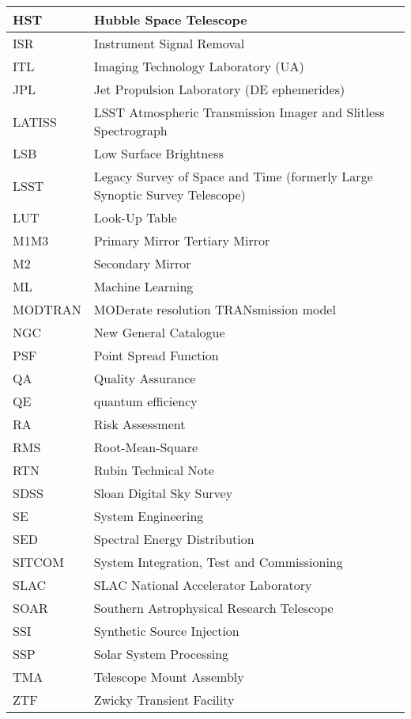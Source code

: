 \begin{longtable}{p{}p{}}
HST & Hubble Space Telescope \\\hline
ISR & Instrument Signal Removal \\\hline
ITL & Imaging Technology Laboratory (UA) \\\hline
JPL & Jet Propulsion Laboratory (DE ephemerides) \\\hline
LATISS & LSST Atmospheric Transmission Imager and Slitless Spectrograph \\\hline
LSB & Low Surface Brightness \\\hline
LSST & Legacy Survey of Space and Time (formerly Large Synoptic Survey Telescope) \\\hline
LUT & Look-Up Table \\\hline
M1M3 & Primary Mirror Tertiary Mirror \\\hline
M2 & Secondary Mirror \\\hline
ML & Machine Learning \\\hline
MODTRAN & MODerate resolution TRANsmission model \\\hline
NGC & New General Catalogue \\\hline
PSF & Point Spread Function \\\hline
QA & Quality Assurance \\\hline
QE & quantum efficiency \\\hline
RA & Risk Assessment \\\hline
RMS & Root-Mean-Square \\\hline
RTN & Rubin Technical Note \\\hline
SDSS & Sloan Digital Sky Survey \\\hline
SE & System Engineering \\\hline
SED & Spectral Energy Distribution \\\hline
SITCOM & System Integration, Test and Commissioning \\\hline
SLAC & SLAC National Accelerator Laboratory \\\hline
SOAR & Southern Astrophysical Research Telescope \\\hline
SSI & Synthetic Source Injection \\\hline
SSP & Solar System Processing \\\hline
TMA & Telescope Mount Assembly \\\hline
ZTF & Zwicky Transient Facility \\\hline
\end{longtable}
